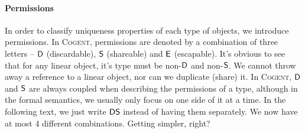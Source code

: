 \documentclass[a4paper]{article}
\newcommand{\cogent}{\textsc{Cogent}\xspace}
\begin{document}
\paragraph{Permissions} In order to classify uniqueness properties of each type of objects, we introduce permissions.
In \cogent, permissions are denoted by a combination of three letters -- $\mathsf{D}$ (discardable), $\mathsf{S}$ (shareable)
and $\mathsf{E}$ (escapable).
It's obvious to see that for any linear object, it's type must be non-$\mathsf{D}$ and non-$\mathsf{S}$. We cannot throw away
a reference to a linear object, nor can we duplicate (share) it. In \cogent, $\mathsf{D}$ and $\mathsf{S}$ are always coupled
when describing the permissions of a type, although in the formal semantics, we usually only focus on one side of it
at a time. In the following text, we just write $\mathsf{DS}$ instead of
having them separately. We now have at most 4 different combinations. Getting simpler, right?
\end{document}
